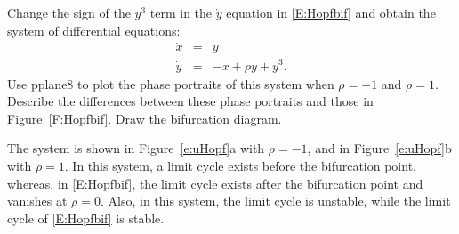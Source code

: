 \documentclass{ximera}
\begin{document}
\begin{exercise}  \label{e:uHopf}
Change the sign of the $y^3$ term in the $\dot{y}$ equation in 
\eqref{E:Hopfbif} and obtain the system of differential equations:
\[
\begin{array}{rcl}
\dot{x} & = & y \\
\dot{y} & = & -x + \rho y + y^3.  \end{array}
\]
Use {\sf pplane8}
to plot the phase portraits of this system when 
$\rho=-1$ and $\rho=1$.  Describe the differences between these phase portraits
and those in Figure~\ref{F:Hopfbif}. Draw the bifurcation diagram.

\begin{solution}

The system is shown in Figure~\ref{e:uHopf}a with $\rho = -1$, and in
Figure~\ref{e:uHopf}b with $\rho = 1$.  In this system, a limit cycle
exists before the bifurcation point, whereas, in \eqref{E:Hopfbif}, the
limit cycle exists after the bifurcation point and vanishes at
$\rho = 0$.  Also, in this system, the limit cycle is unstable, while
the limit cycle of \eqref{E:Hopfbif} is stable.

\begin{figure}[htb]
                       \centerline{%
                       }
\end{figure}

\end{solution}
\end{exercise}
\end{document}

